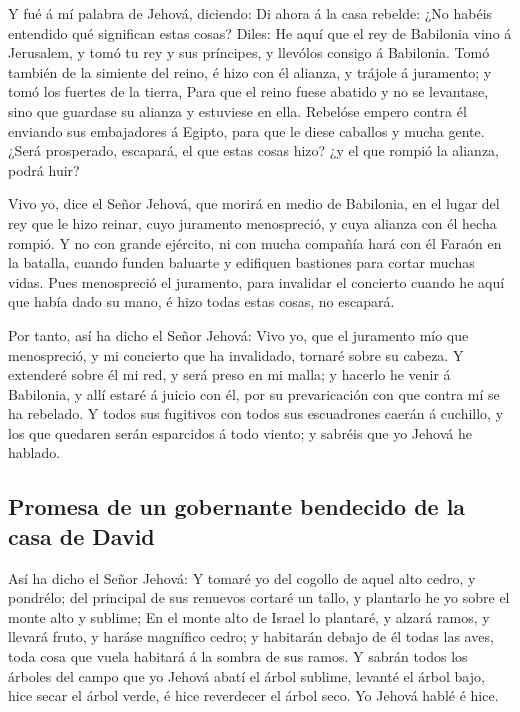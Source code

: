  Y fué á mí palabra de Jehová, diciendo: 
Di ahora á la casa rebelde: ¿No habéis entendido qué significan estas
cosas? Diles: He aquí que el rey de Babilonia vino á Jerusalem, y tomó
tu rey y sus príncipes, y llevólos consigo á Babilonia. 
Tomó también de la simiente del reino, é hizo con él alianza, y trájole
á juramento; y tomó los fuertes de la tierra,  Para que
el reino fuese abatido y no se levantase, sino que guardase su alianza y
estuviese en ella.  Rebelóse empero contra él enviando
sus embajadores á Egipto, para que le diese caballos y mucha gente.
¿Será prosperado, escapará, el que estas cosas hizo? ¿y el que rompió la
alianza, podrá huir?

 Vivo yo, dice el Señor Jehová, que morirá en medio de
Babilonia, en el lugar del rey que le hizo reinar, cuyo juramento
menospreció, y cuya alianza con él hecha rompió.  Y no
con grande ejército, ni con mucha compañía hará con él Faraón en la
batalla, cuando funden baluarte y edifiquen bastiones para cortar muchas
vidas.  Pues menospreció el juramento, para invalidar el
concierto cuando he aquí que había dado su mano, é hizo todas estas
cosas, no escapará.

 Por tanto, así ha dicho el Señor Jehová: Vivo yo, que el
juramento mío que menospreció, y mi concierto que ha invalidado, tornaré
sobre su cabeza.  Y extenderé sobre él mi red, y será
preso en mi malla; y hacerlo he venir á Babilonia, y allí estaré á
juicio con él, por su prevaricación con que contra mí se ha rebelado.
 Y todos sus fugitivos con todos sus escuadrones caerán á
cuchillo, y los que quedaren serán esparcidos á todo viento; y sabréis
que yo Jehová he hablado.

\hypertarget{promesa-de-un-gobernante-bendecido-de-la-casa-de-david}{%
\subsection{Promesa de un gobernante bendecido de la casa de
David}\label{promesa-de-un-gobernante-bendecido-de-la-casa-de-david}}

 Así ha dicho el Señor Jehová: Y tomaré yo del cogollo de
aquel alto cedro, y pondrélo; del principal de sus renuevos cortaré un
tallo, y plantarlo he yo sobre el monte alto y sublime; 
En el monte alto de Israel lo plantaré, y alzará ramos, y llevará fruto,
y haráse magnífico cedro; y habitarán debajo de él todas las aves, toda
cosa que vuela habitará á la sombra de sus ramos.  Y
sabrán todos los árboles del campo que yo Jehová abatí el árbol sublime,
levanté el árbol bajo, hice secar el árbol verde, é hice reverdecer el
árbol seco. Yo Jehová hablé é hice.

